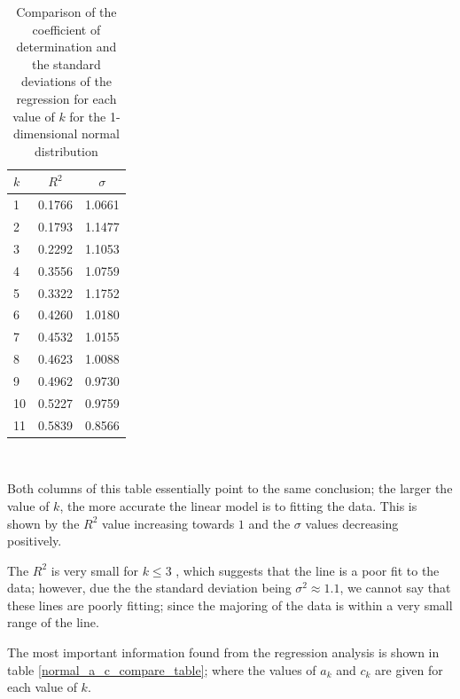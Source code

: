 \documentclass[12pt]{report}
\begin{document}
\begin{table}
\caption{Comparison of the coefficient of determination and the standard deviations of the regression for each value of $k$ for the 1-dimensional normal distribution} \label{normal_rsq}
\begin{center}
\begin{tabular}{| l | c c |} 
\toprule
$k$ & $R^2$ & $\sigma$ \\
\midrule[1pt]
1     & 0.1766    & 1.0661    \\
2     & 0.1793    & 1.1477    \\
3     & 0.2292    & 1.1053    \\
4     & 0.3556    & 1.0759    \\
5     & 0.3322    & 1.1752   \\
6     & 0.4260    & 1.0180   \\
7     & 0.4532    & 1.0155   \\
8     & 0.4623    & 1.0088   \\
9     & 0.4962    & 0.9730   \\
10    & 0.5227    & 0.9759   \\
11    & 0.5839    & 0.8566  \\
\hline
\end{tabular}
\\[10pt]
\end{center}
\end{table}

Both columns of this table essentially point to the same conclusion; the larger the value of $k$, the more accurate the linear model is to fitting the data. This is shown by the $R^2$ value increasing towards $1$ and the $\sigma$ values decreasing positively. 

The $R^2$ is very small for $k \leq 3$ , which suggests that the line is a poor fit to the data; however, due the the standard deviation being $\sigma^2 \approx 1.1$, we cannot say that these lines are poorly fitting; since the majoring of the data is within a very small range of the line.

The most important information found from the regression analysis is shown in table \ref{normal_a_c_compare_table}; where the values of $a_{k}$ and $c_{k}$ are given for each value of $k$.
\end{document}
